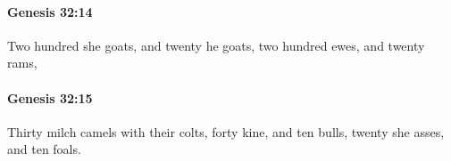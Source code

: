 		\paragraph{Genesis 32:14} %
			\label{GENESIS-32-14}

			Two hundred she goats, and twenty he goats, two hundred ewes, and twenty rams,


		\paragraph{Genesis 32:15} %
			\label{GENESIS-32-15}

			Thirty milch camels with their colts, forty kine, and ten bulls, twenty she asses, and ten foals.


